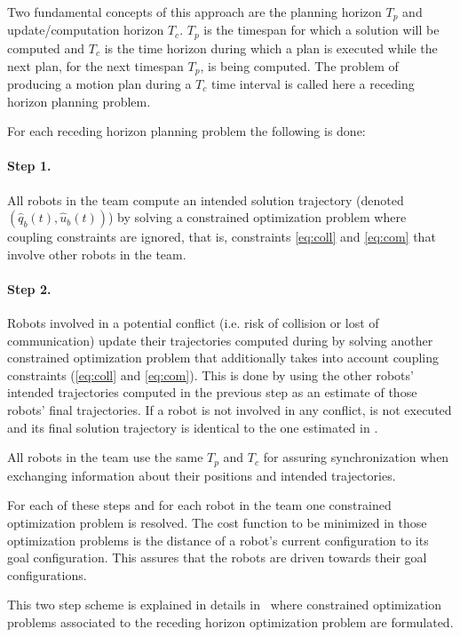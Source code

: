 \documentclass[eprint]{actapoly}
\begin{document}
Two fundamental concepts of this approach are the planning horizon $T_p$ and 
update/computation horizon $T_c$. $T_p$ is the timespan for which a solution 
will be computed and
$T_c$ is the time horizon during which a plan is executed while the
next plan, for the next timespan $T_p$, is being computed.
The problem of producing a motion plan during a $T_c$ time interval is called
here a receding horizon planning problem.

For each receding horizon planning problem the following is done:
\paragraph{Step 1.}\label{step1} All robots in the team compute an intended solution trajectory (denoted $(\hat{q}_b(t), \hat{u}_b(t))$)
by solving a constrained optimization problem where coupling
constraints are ignored, that is, constraints \ref{eq:coll} and \ref{eq:com} that involve 
other robots in the team.
\paragraph{Step 2.}\label{step2} Robots involved in a potential conflict (i.e. risk of collision 
or lost of communication) update their trajectories computed during  by solving another constrained optimization problem
that additionally takes into account
coupling constraints (\ref{eq:coll} and \ref{eq:com}).
This is done by using the other robots' intended
trajectories computed in the previous step as an estimate of those robots'
final trajectories. If a robot is not involved in any conflict, 
is not executed and its final
solution trajectory is identical to the one estimated in .

\mbox{}

All robots in the team use the same $T_p$ and $T_c$ for assuring synchronization when exchanging information about their positions and intended trajectories.

For each of these steps and for each robot in the team one constrained optimization problem is resolved. The cost function to be minimized in those
optimization problems
is the distance of a robot's current configuration to its goal configuration.
This assures that the robots are driven towards their goal configurations.

This two step scheme is explained in details in~\cite{Defoort2007a} where 
constrained optimization problems associated to the receding horizon 
optimization problem are formulated.
\end{document}
